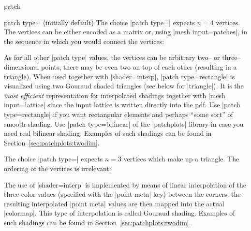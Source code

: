 {\begin{plottype}[/pgfplots]{patch}
\begin{pgfplotskey}{patch type= (initially default)}
	The choice |patch type=| expects $n=4$ vertices. The vertices can be either encoded as a matrix or, using |mesh input=patches|, in the sequence in which you would connect the vertices:
\begin{codeexample}[]
\end{codeexample}
\begin{codeexample}[]
\end{codeexample}
	\noindent As for all other |patch type| values, the vertices can be arbitrary two-- or three--dimensional points, there may be even two on top of each other (resulting in a triangle). When used together with |shader=interp|, |patch type=rectangle| is visualized using two Gouraud shaded triangles (see below for |triangle|). It is the \emph{most efficient} representation for interpolated shadings together with |mesh input=lattice| since the input lattice is written directly into the pdf. Use |patch type=rectangle| if you want rectangular elements and perhaps ``some sort'' of smooth shading. Use |patch type=bilinear| of the |patchplots| library in case you need real bilinear shading. Examples of such shadings can be found in Section~\ref{sec:patchplots:twodim}.

	The choice |patch type=| expects $n=3$ vertices which make up a triangle. The ordering of the vertices is irrelevant: 
\begin{codeexample}[]
\end{codeexample}
	\noindent The use of |shader=interp| is implemented by means of linear interpolation of the three color values (specified with the |point meta| key) between the corners; the resulting interpolated |point meta| values are then mapped into the actual |colormap|. This type of interpolation is called Gouraud shading. Examples of such shadings can be found in Section~\ref{sec:patchplots:twodim}.



\end{pgfplotskey}
\end{plottype}}
